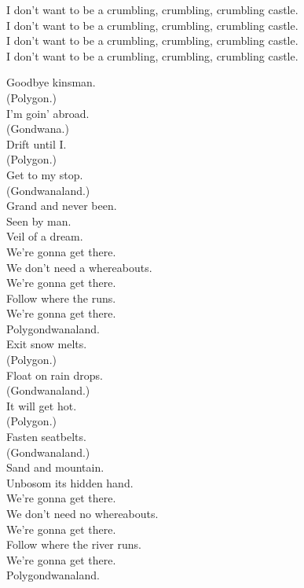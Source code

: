 I don't want to be a crumbling, crumbling, crumbling castle. \\
I don't want to be a crumbling, crumbling, crumbling castle. \\
I don't want to be a crumbling, crumbling, crumbling castle. \\
I don't want to be a crumbling, crumbling, crumbling castle. \\




Goodbye kinsman. \\
(Polygon.) \\
I'm goin' abroad. \\
(Gondwana.) \\
Drift until I. \\
(Polygon.) \\
Get to my stop. \\
(Gondwanaland.) \\
Grand and never been. \\
Seen by man. \\
Veil of a dream. \\

We're gonna get there. \\
We don't need a whereabouts. \\
We're gonna get there. \\
Follow where the  runs. \\
We're gonna get there. \\
Polygondwanaland. \\

Exit snow melts. \\
(Polygon.) \\
Float on rain drops. \\
(Gondwanaland.) \\
It will get hot. \\
(Polygon.) \\
Fasten seatbelts. \\
(Gondwanaland.) \\
Sand and mountain. \\
Unbosom its hidden hand. \\

We're gonna get there. \\
We don't need no whereabouts. \\
We're gonna get there. \\
Follow where the river runs. \\
We're gonna get there. \\
Polygondwanaland. \\

